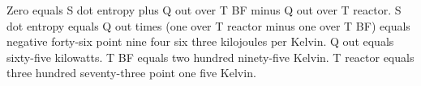 Zero equals S dot entropy plus Q out over T BF minus Q out over T reactor.  
S dot entropy equals Q out times (one over T reactor minus one over T BF) equals negative forty-six point nine four six three kilojoules per Kelvin.  
Q out equals sixty-five kilowatts.  
T BF equals two hundred ninety-five Kelvin.  
T reactor equals three hundred seventy-three point one five Kelvin.